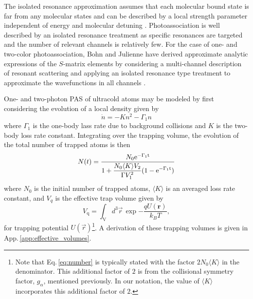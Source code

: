 The isolated resonance approximation assumes that each molecular bound state is far from any molecular states and can be described by a local strength parameter independent of energy and molecular detuning \cite{Bohn1999, Nicholson2015a}.
Photoassociation is well described by an isolated resonance treatment as specific resonances are targeted and the number of relevant channels is relatively few.
For the case of one- and two-color photoassociation, Bohn and Julienne have derived approximate analytic expressions of the $S$-matrix elements by considering a multi-channel description of resonant scattering and applying an isolated resonance type treatment to approximate the wavefunctions in all channels \cite{Bohn1999, Bohn1996, Julienne2006}.

One- and two-photon PAS of ultracold atoms may be modeled by first considering the evolution of a local density given by
\begin{equation}
	\dot{n} = - K n^2 - \Gamma_1 n
\end{equation}
where $\Gamma_1$ is the one-body lass rate due to background collisions and $K$ is the two-body loss rate constant.
Integrating over the trapping volume, the evolution of the total number of trapped atoms is then
\begin{equation}\label{eq:number}
   N(t)= \frac{N_0 \rm{e}^{-\Gamma_1 t}}
   		{\displaystyle 1 + \frac{N_0 \langle K \rangle V_2}{\Gamma V_1^2}(1-\rm{e}^{-\Gamma_1 t}) }
\end{equation}
where $N_0$ is the initial number of trapped atoms, $\langle K \rangle$ is an averaged loss rate constant, and $V_q$ is the effective trap volume given by
\begin{equation}\label{eq:effectivevolumes}
	V_{\text{q}}=\int_{\mathrm{V}} d^3\vec{r} \, \exp{-\frac{qU(\mathbf{r})}{k_{B}T}},
\end{equation}
for trapping potential $U(\vec{r})$\footnote{Note that Eq.\,\ref{eq:number} is typically stated with the factor $2 N_0 \langle K \rangle$ in the denominator. This additional factor of $2$ is from the collisional symmetry factor, $g_\alpha$, mentioned previously. In our notation, the value of $\langle K \rangle$ incorporates this additional factor of $2$.}.
A derivation of these trapping volumes is given in App.\,\ref{app:effective_volumes}.

